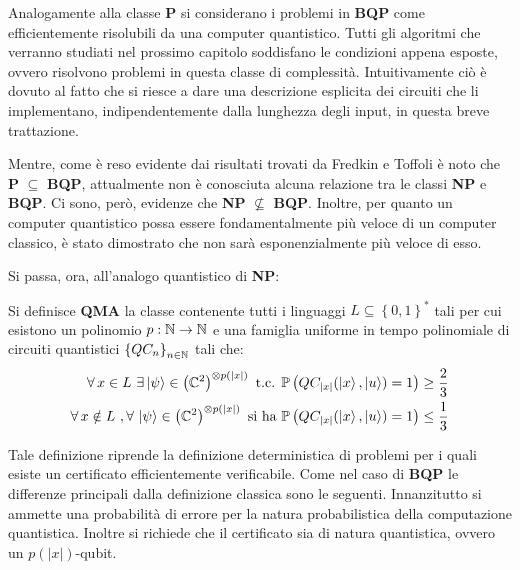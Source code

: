 Analogamente alla classe \textbf{P} si considerano i problemi in \textbf{BQP} come efficientemente risolubili da una computer quantistico.
Tutti gli algoritmi che verranno studiati nel prossimo capitolo soddisfano le condizioni appena esposte, ovvero risolvono problemi in questa classe di complessità.
Intuitivamente ciò è dovuto al fatto che si riesce a dare una descrizione esplicita dei circuiti che li implementano, indipendentemente dalla lunghezza degli input, in questa breve trattazione.

Mentre, come è reso evidente dai risultati trovati da Fredkin e Toffoli è noto che \textbf{P} $\subseteq$ \textbf{BQP}, attualmente non è conosciuta alcuna relazione tra le classi \textbf{NP} e \textbf{BQP}.
Ci sono, però, evidenze che \textbf{NP} $\nsubseteq$ \textbf{BQP}.
Inoltre, per quanto un computer quantistico possa essere fondamentalmente più veloce di un computer classico, è stato dimostrato che non sarà esponenzialmente più veloce di esso.

Si passa, ora, all'analogo quantistico di \textbf{NP}:
\begin{defn}\label{defn:QMA}
 Si definisce \textbf{QMA} la classe contenente tutti i linguaggi $L \subseteq \left\{0,1\right\}^*$ tali per cui esistono un polinomio $p: \mathbb{N} \to \mathbb{N}$ e una famiglia uniforme in tempo polinomiale di circuiti quantistici $\left\{ QC_n \right\}_{n \in \mathbb{N}}$ tali che:
 \begin{align}
  \forall\, x \in L\ \exists \ket{\psi} \in \left(\mathbb{C}^{2}\right)^{\otimes p(|x|)} \text{ t.c. }& \mathbb{P}\left( QC_{|x|}(\ket{x},\ket{u}) = 1 \right) \geq \frac{2}{3}\\
  \forall\, x \notin L\ , \forall\, \ket{\psi} \in \left(\mathbb{C}^{2}\right)^{\otimes p(|x|)} \text{ si ha }& \mathbb{P}\left( QC_{|x|}(\ket{x},\ket{u}) = 1 \right) \leq \frac{1}{3}
 \end{align}
\end{defn}
Tale definizione riprende la definizione deterministica di problemi per i quali esiste un certificato efficientemente verificabile.
Come nel caso di \textbf{BQP} le differenze principali dalla definizione classica sono le seguenti.
Innanzitutto si ammette una probabilità di errore per la natura probabilistica della computazione quantistica.
Inoltre si richiede che il certificato sia di natura quantistica, ovvero un $p(|x|)$-qubit.
